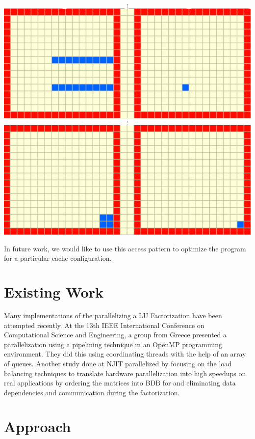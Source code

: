\documentclass[12]{article}
\begin{document}
\begin{center}
$$\vdots$$
\includegraphics[scale=0.33]{figures/lu6}
$$\vdots$$
\includegraphics[scale=0.33]{figures/lu7}
\end{center}

In future work, we would like to use this access pattern to optimize the program for a particular cache configuration.

\section{Existing Work}

Many implementations of the parallelizing a LU Factorization have been attempted recently. At the 13th IEEE International Conference on Computational Science and Engineering, a group from Greece presented a parallelization using a pipelining technique in an OpenMP programming environment. They did this using coordinating threads with the help of an array of queues.  Another study done at NJIT parallelized by focusing on the load balancing techniques to translate hardware parallelization into high speedups on real applications by ordering the matrices into BDB for and eliminating data dependencies and communication during the factorization. 

\section{Approach}
\end{document}
